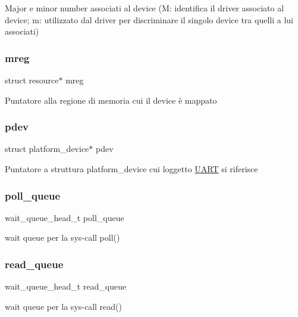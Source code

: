 Major e minor number associati al device (M\+: identifica il driver associato al device; m\+: utilizzato dal driver per discriminare il singolo device tra quelli a lui associati) \mbox{\label{structUART_a18c4eb95350c67ccb239a8a39c43c09a}} 
\subsubsection{\texorpdfstring{mreg}{mreg}}
{\footnotesize\ttfamily struct resource$\ast$ mreg}

Puntatore alla regione di memoria cui il device è mappato \mbox{\label{structUART_a6fb27e0c8e2d8544acca44725266b5d3}} 
\subsubsection{\texorpdfstring{pdev}{pdev}}
{\footnotesize\ttfamily struct platform\+\_\+device$\ast$ pdev}

Puntatore a struttura platform\+\_\+device cui l\textquotesingle{}oggetto \hyperlink{structUART}{U\+A\+RT} si riferisce \mbox{\label{structUART_a2080617f88cafd765430573afe7701d1}} 
\subsubsection{\texorpdfstring{poll\+\_\+queue}{poll\_queue}}
{\footnotesize\ttfamily wait\+\_\+queue\+\_\+head\+\_\+t poll\+\_\+queue}

wait queue per la sys-\/call poll() \mbox{\label{structUART_a251570f8e6976ad87411093e330e7b4f}} 
\subsubsection{\texorpdfstring{read\+\_\+queue}{read\_queue}}
{\footnotesize\ttfamily wait\+\_\+queue\+\_\+head\+\_\+t read\+\_\+queue}

wait queue per la sys-\/call read() \mbox{\label{structUART_a4a49895b3f09db037a0b8df5c9b8d874}} 
